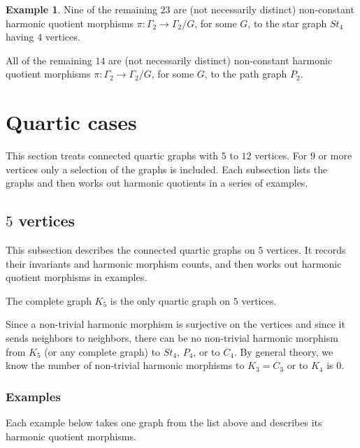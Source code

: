 \documentclass[12pt,letterpaper]{article}
\theoremstyle{definition}
\newtheorem{example}[theorem]{Example}
\begin{document}
\begin{example}
{Nine of the remaining $23$ are (not necessarily distinct)
non-constant harmonic quotient
morphisms $\pi: \Gamma_2\to \Gamma_2/G$, for some $G$, to
the star graph $St_4$ having $4$ vertices.

All of the remaining $14$ are (not necessarily distinct)
non-constant harmonic quotient
morphisms $\pi: \Gamma_2\to \Gamma_2/G$, for some $G$, to
the path graph $P_2$.
}
\end{example}



\section{Quartic cases}
\label{sec:quartic-examples}

This section treats connected quartic graphs with $5$ to $12$ vertices.
For $9$ or more vertices only a selection of the graphs is included.
Each subsection lists the graphs and then works out harmonic quotients
in a series of examples.


\subsection{\texorpdfstring{$5$}{5} vertices}

This subsection describes the connected quartic graphs on $5$ vertices.
It records their invariants and harmonic morphism counts, and then
works out harmonic quotient morphisms in examples.


The complete graph $K_5$ is the only quartic graph on $5$ vertices.

Since a non-trivial harmonic morphism is surjective on the vertices and
since it sends neighbors to neighbors, there can be no non-trivial
harmonic morphism from $K_5$ (or any complete graph) to
$St_4$, $P_4$, or to $C_4$.
By general theory, we know
the number of non-trivial harmonic morphisms to $K_3=C_3$ or to $K_4$ is $0$. 


\subsubsection{Examples}

Each example below takes one graph from the list above and describes
its harmonic quotient morphisms.
\end{document}
